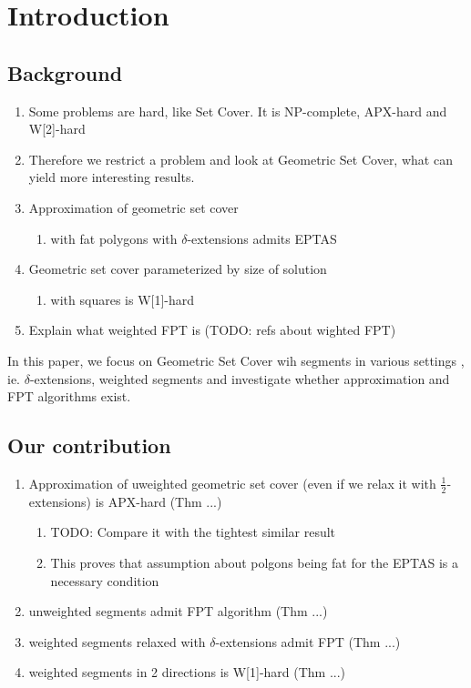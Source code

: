 \chapter{Introduction}

\section{Background}
\begin{enumerate}
\item Some problems are hard, like Set Cover. It is NP-complete,
APX-hard and W[2]-hard \cite{platypus_book}
\item Therefore we restrict a problem and look at Geometric Set Cover,
      what can yield more interesting results.
\item Approximation of geometric set cover
	\begin{enumerate}
		\item with fat polygons with $\delta$-extensions admits EPTAS \cite{harpeled12}
	\end{enumerate}
\item Geometric set cover parameterized by size of solution
	\begin{enumerate}
		\item with squares is W[1]-hard
	\end{enumerate}
\item Explain what weighted FPT is (TODO: refs about wighted FPT)
\end{enumerate}

In this paper, we focus on Geometric Set Cover wih segments
in various settings , ie. $\delta$-extensions, weighted segments
and investigate whether approximation and FPT algorithms exist.


\section{Our contribution}
\begin{enumerate}
\item Approximation of uweighted geometric set cover (even if we relax it with 
$\frac{1}{2}$-extensions) is APX-hard (Thm ...)
	\begin{enumerate}
	\item TODO: Compare it with the tightest similar result
	\item This proves that assumption about polgons being fat for
	the EPTAS is a necessary condition
	\end{enumerate}
\item unweighted segments admit FPT algorithm (Thm ...)
\item weighted segments relaxed with $\delta$-extensions admit FPT (Thm ...)
\item weighted segments in 2 directions is W[1]-hard (Thm ...)
\end{enumerate}


